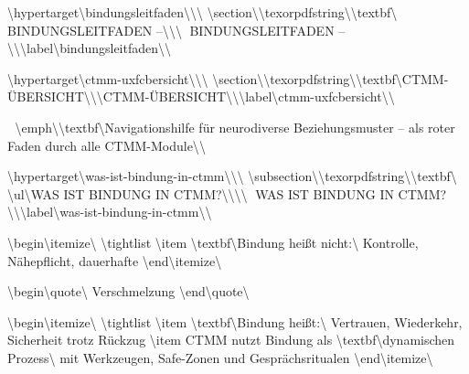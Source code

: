 \textbackslash{}hypertarget\textbackslash{}{bindungsleitfaden\textbackslash{}}\textbackslash{}{\textbackslash{}%
\textbackslash{}section\textbackslash{}{\textbackslash{}texorpdfstring\textbackslash{}{\textbackslash{}textbf\textbackslash{}{🏥 BINDUNGSLEITFADEN --\textbackslash{}}\textbackslash{}}\textbackslash{}{🏥 BINDUNGSLEITFADEN --\textbackslash{}}\textbackslash{}}\textbackslash{}label\textbackslash{}{bindungsleitfaden\textbackslash{}}\textbackslash{}}

\textbackslash{}hypertarget\textbackslash{}{ctmm-uxfcbersicht\textbackslash{}}\textbackslash{}{\textbackslash{}%
\textbackslash{}section\textbackslash{}{\textbackslash{}texorpdfstring\textbackslash{}{\textbackslash{}textbf\textbackslash{}{CTMM-ÜBERSICHT\textbackslash{}}\textbackslash{}}\textbackslash{}{CTMM-ÜBERSICHT\textbackslash{}}\textbackslash{}}\textbackslash{}label\textbackslash{}{ctmm-uxfcbersicht\textbackslash{}}\textbackslash{}}

🧩 \textbackslash{}emph\textbackslash{}{\textbackslash{}textbf\textbackslash{}{Navigationshilfe für neurodiverse Beziehungsmuster -- als roter Faden durch alle CTMM-Module\textbackslash{}}\textbackslash{}}

\textbackslash{}hypertarget\textbackslash{}{was-ist-bindung-in-ctmm\textbackslash{}}\textbackslash{}{\textbackslash{}%
\textbackslash{}subsection\textbackslash{}{\textbackslash{}texorpdfstring\textbackslash{}{\textbackslash{}textbf\textbackslash{}{📘 \textbackslash{}ul\textbackslash{}{WAS IST BINDUNG IN CTMM?\textbackslash{}}\textbackslash{}}\textbackslash{}}\textbackslash{}{📘 WAS IST BINDUNG IN CTMM?\textbackslash{}}\textbackslash{}}\textbackslash{}label\textbackslash{}{was-ist-bindung-in-ctmm\textbackslash{}}\textbackslash{}}

\textbackslash{}begin\textbackslash{}{itemize\textbackslash{}}
\textbackslash{}tightlist
\textbackslash{}item
  \textbackslash{}textbf\textbackslash{}{Bindung heißt nicht:\textbackslash{}} Kontrolle, Nähepflicht, dauerhafte
\textbackslash{}end\textbackslash{}{itemize\textbackslash{}}

\textbackslash{}begin\textbackslash{}{quote\textbackslash{}}
Verschmelzung
\textbackslash{}end\textbackslash{}{quote\textbackslash{}}

\textbackslash{}begin\textbackslash{}{itemize\textbackslash{}}
\textbackslash{}tightlist
\textbackslash{}item
  \textbackslash{}textbf\textbackslash{}{Bindung heißt:\textbackslash{}} Vertrauen, Wiederkehr, Sicherheit trotz Rückzug
\textbackslash{}item
  CTMM nutzt Bindung als \textbackslash{}textbf\textbackslash{}{dynamischen Prozess\textbackslash{}} mit Werkzeugen, Safe-Zonen und Gesprächsritualen
\textbackslash{}end\textbackslash{}{itemize\textbackslash{}}

